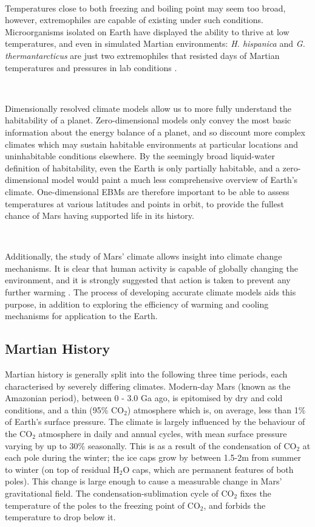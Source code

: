 \documentclass[12pt,onecolumn]{revtex4-2}    %
\begin{document}
\

Temperatures close to both freezing and boiling point may seem too broad, however, extremophiles are capable of existing under such conditions. Microorganisms isolated on Earth have displayed the ability to thrive at low temperatures, and even in simulated Martian environments: \textit{H. hispanica} and \textit{G. thermantarcticus} are just two extremophiles that resisted days of Martian temperatures and pressures in lab conditions \cite{M14}.

\

Dimensionally resolved climate models allow us to more fully understand the habitability of a planet. Zero-dimensional models only convey the most basic information about the energy balance of a planet, and so discount more complex climates which may sustain habitable environments at particular locations and uninhabitable conditions elsewhere. By the seemingly broad liquid-water definition of habitability, even the Earth is only partially habitable, and a zero-dimensional model would paint a much less comprehensive overview of Earth's climate. One-dimensional EBMs are therefore important to be able to assess temperatures at various latitudes and points in orbit, to provide the fullest chance of Mars having supported life in its history.

\

Additionally, the study of Mars' climate allows insight into climate change mechanisms. It is clear that human activity is capable of globally changing the environment, and it is strongly suggested that action is taken to prevent any further warming \cite{IPCC23}. The process of developing accurate climate models aids this purpose, in addition to exploring the efficiency of warming and cooling mechanisms for application to the Earth.

\subsection{Martian History}

Martian history is generally split into the following three time periods, each characterised by severely differing climates. Modern-day Mars (known as the Amazonian period), between 0 - 3.0 Ga ago, is epitomised by dry and cold conditions, and a thin (95\% $\mathrm{CO_2}$) atmosphere which is, on average, less than 1\% of Earth's surface pressure. The climate is largely influenced by the behaviour of the $\mathrm{CO_2}$ atmosphere in daily and annual cycles, with mean surface pressure varying by up to 30\% seasonally. This is as a result of the condensation of $\mathrm{CO_2}$ at each pole during the winter; the ice caps grow by between 1.5-2m from summer to winter (on top of residual $\mathrm{H_2O}$ caps, which are permanent features of both poles). This change is large enough to cause a measurable change in Mars' gravitational field. The condensation-sublimation cycle of $\mathrm{CO_2}$ fixes the temperature of the poles to the freezing point of $\mathrm{CO_2}$, and forbids the temperature to drop below it.
\end{document}
